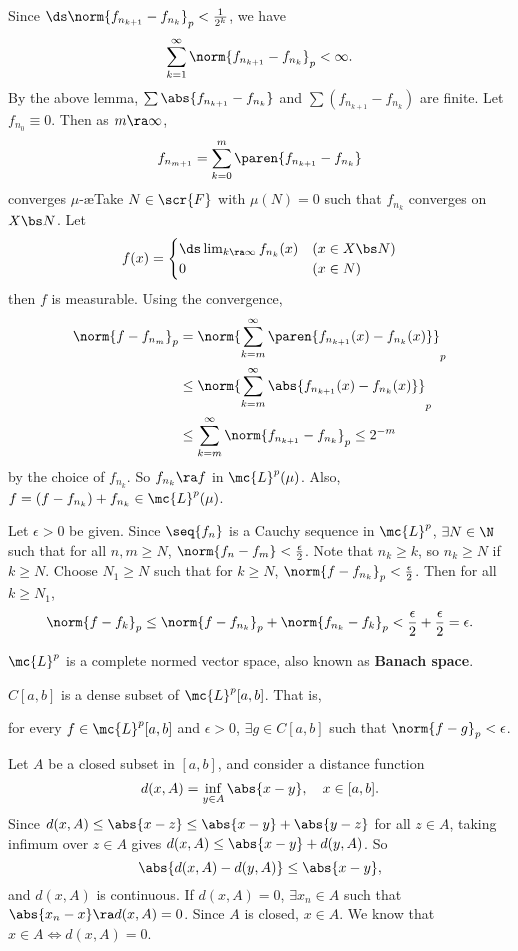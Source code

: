 Since \(\ds \norm{f_{n_{k+1}} - f_{n_k}}_p < \frac{1}{2^k}\), we have
\[
    \sum_{k=1}^{\infty} \norm{f_{n_{k+1}} - f_{n_k}}_p < \infty.
\]
By the above lemma, \(\sum \abs{f_{n_{k+1}} - f_{n_k}}\) and \(\sum (f_{n_{k+1}} - f_{n_k})\) are finite. Let \(f_{n_0} \equiv 0\). Then as \(m \ra \infty\),
\[
    f_{n_{m+1}} = \sum_{k=0}^{m} \paren{f_{n_{k+1}} - f_{n_k}}
\]
converges \(\mu\)-\ae Take \(N \in \scr{F}\) with \(\mu(N) = 0\) such that \(f_{n_k}\) converges on \(X \bs N\). Let
\[
    f(x) = \begin{cases}
        \ds \lim_{k \ra \infty} f_{n_k} (x) & (x \in X \bs N) \\ 0 & (x\in N)
    \end{cases}
\]
then \(f\) is measurable. Using the convergence,
\[
    \begin{aligned}
        \norm{f - f_{n_m}}_p & = \norm{\sum_{k=m}^{\infty} \paren{f_{n_{k+1}} (x) - f_{n_k}(x)}}_p  \\
                             & \leq \norm{\sum_{k=m}^{\infty} \abs{f_{n_{k+1}} (x) - f_{n_k}(x)}}_p \\
                             & \leq \sum_{k=m}^{\infty} \norm{f_{n_{k+1}} - f_{n_k}}_p \leq 2^{-m}
    \end{aligned}
\]
by the choice of \(f_{n_k}\). So \(f_{n_k} \ra f\) in \(\mc{L}^{p}(\mu)\). Also, \(f = (f - f_{n_k}) + f_{n_k} \in \mc{L}^{p}(\mu)\).

Let \(\epsilon > 0\) be given. Since \(\seq{f_n}\) is a Cauchy sequence in \(\mc{L}^{p}\), \(\exists N \in \N\) such that for all \(n, m \geq N\), \(\norm{f_n - f_m} < \frac{\epsilon}{2}\). Note that \(n_k \geq k\), so \(n_k \geq N\) if \(k \geq N\). Choose \(N_1 \geq N\) such that for \(k \geq N\), \(\norm{f - f_{n_k}}_p < \frac{\epsilon}{2}\). Then for all \(k \geq N_1\),
\[
    \norm{f - f_k}_p \leq \norm{f - f_{n_k}}_p + \norm{f_{n_k} - f_k}_p < \frac{\epsilon}{2} + \frac{\epsilon}{2} = \epsilon.
\]

\rmk \(\mc{L}^{p}\) is a complete normed vector space, also known as \textbf{Banach space}.

 \(C[a, b]\) is a dense subset of \(\mc{L}^{p}[a, b]\). That is,
\begin{center}
    for every \(f \in \mc{L}^{p}[a, b]\) and \(\epsilon > 0\), \(\exists g \in C[a, b]\) such that \(\norm{f - g}_p < \epsilon\).
\end{center}

\pf Let \(A\) be a closed subset in \([a, b]\), and consider a distance function
\[
    d(x, A) = \inf_{y\in A} \abs{x - y}, \quad x \in [a, b].
\]
Since \(d(x, A) \leq \abs{x - z} \leq \abs{x - y} + \abs{y - z}\) for all \(z \in A\), taking infimum over \(z \in A\) gives \(d(x, A) \leq \abs{x - y} + d(y, A)\). So
\[
    \abs{d(x, A) - d(y, A)} \leq \abs{x - y},
\]
and \(d(x, A)\) is continuous. If \(d(x, A) = 0\), \(\exists x_n \in A\) such that \(\abs{x_n - x} \ra d(x, A) = 0\). Since \(A\) is closed, \(x \in A\). We know that \(x \in A \iff d(x, A) = 0\).

